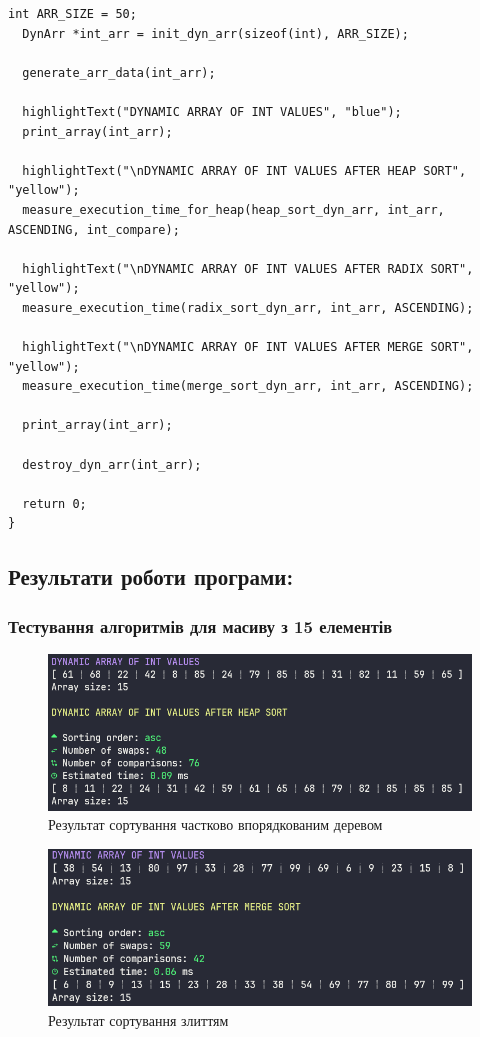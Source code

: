 \begin{lstlisting}[style=customc]
  int ARR_SIZE = 50;
  DynArr *int_arr = init_dyn_arr(sizeof(int), ARR_SIZE);

  generate_arr_data(int_arr);

  highlightText("DYNAMIC ARRAY OF INT VALUES", "blue");
  print_array(int_arr);

  highlightText("\nDYNAMIC ARRAY OF INT VALUES AFTER HEAP SORT", "yellow");
  measure_execution_time_for_heap(heap_sort_dyn_arr, int_arr, ASCENDING, int_compare);

  highlightText("\nDYNAMIC ARRAY OF INT VALUES AFTER RADIX SORT", "yellow");
  measure_execution_time(radix_sort_dyn_arr, int_arr, ASCENDING);

  highlightText("\nDYNAMIC ARRAY OF INT VALUES AFTER MERGE SORT", "yellow");
  measure_execution_time(merge_sort_dyn_arr, int_arr, ASCENDING);

  print_array(int_arr);

  destroy_dyn_arr(int_arr);

  return 0;
}
\end{lstlisting}


\clearpage
\subsection{Результати роботи програми:}
\subsubsection{Тестування алгоритмів для масиву з 15 елементів}
\begin{figure}[h!]
  \centering
  \includegraphics[width=15cm]{reports/algos/lab12/assets/heap.png}
  \caption{Результат сортування частково впорядкованим деревом}
\end{figure}

\begin{figure}[h!]
  \centering
  \includegraphics[width=15cm]{reports/algos/lab12/assets/merge.png}
  \caption{Результат сортування злиттям}
\end{figure}

